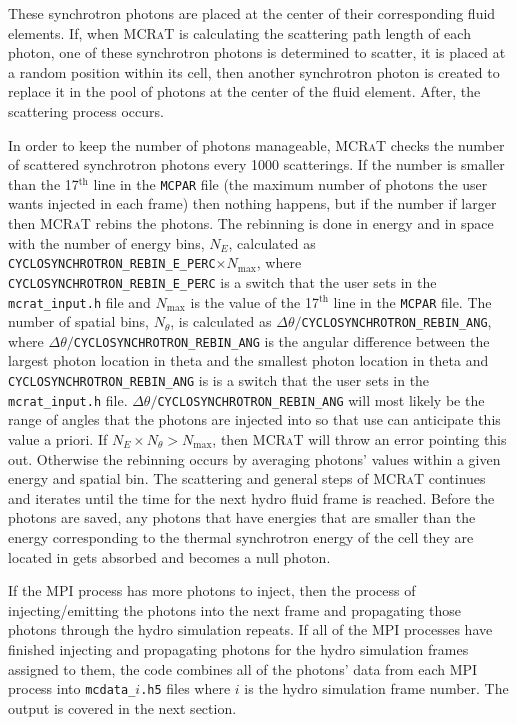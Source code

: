 \documentclass[12pt,a4paper]{article}
\newcommand{\mcrat}{\textsc{MCRaT}}
\begin{document}
These synchrotron photons are placed at the center of their corresponding fluid elements. If, when \mcrat{} is calculating the scattering path length of each photon, one of these synchrotron photons is determined to scatter, it is placed at a random position within its cell, then another synchrotron photon is created to replace it in the pool of photons at the center of the fluid element. After, the scattering process occurs.

In order to keep the number of photons manageable, \mcrat{} checks the number of scattered synchrotron photons every 1000 scatterings. If the number is smaller than the 17$^\textrm{th}$ line in the \texttt{MCPAR} file (the maximum number of photons the user wants injected in each frame) then nothing happens, but if the number if larger then \mcrat{} rebins the photons. The rebinning is done in energy and in space with the number of energy bins, $N_E$, calculated as \texttt{CYCLOSYNCHROTRON\_REBIN\_E\_PERC}$\times N_\mathrm{max}$, where \texttt{CYCLOSYNCHROTRON\_REBIN\_E\_PERC} is a switch that the user sets in the \texttt{mcrat\_input.h} file and $N_\mathrm{max}$ is the value of the 17$^\textrm{th}$ line in the \texttt{MCPAR} file. The number of spatial bins, $N_\theta$, is calculated as $\Delta \theta/$\texttt{CYCLOSYNCHROTRON\_REBIN\_ANG}, where $\Delta \theta/$\texttt{CYCLOSYNCHROTRON\_REBIN\_ANG} is the angular difference between the largest photon location in theta and the smallest photon location in theta and \texttt{CYCLOSYNCHROTRON\_REBIN\_ANG} is is a switch that the user sets in the \texttt{mcrat\_input.h} file. $\Delta \theta/$\texttt{CYCLOSYNCHROTRON\_REBIN\_ANG} will most likely be the range of angles that the photons are injected into so that use can anticipate this value a priori. If $N_E\times N_\theta>N_\mathrm{max}$, then \mcrat{} will throw an error pointing this out. Otherwise the rebinning occurs by averaging photons' values within a given energy and spatial bin. The scattering and general steps of \mcrat{} continues and iterates until the time for the next hydro fluid frame is reached. Before the photons are saved, any photons that have energies that are smaller than the energy corresponding to the thermal synchrotron energy of the cell they are located in gets absorbed and becomes a null photon. 

If the MPI process has more photons to inject, then the process of injecting/emitting the photons into the next frame and propagating those photons through the hydro simulation repeats. If all of the MPI processes have finished injecting and propagating photons for the hydro simulation frames assigned to them, the code combines all of the photons' data from each MPI process into \texttt{mcdata\_$i$.h5} files where $i$ is the hydro simulation frame number. The output is covered in the next section.
\end{document}
